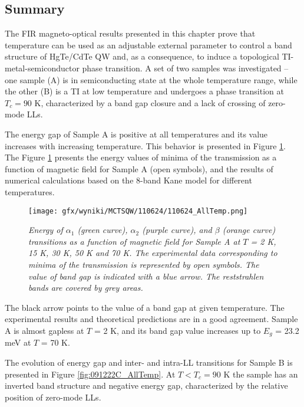 \documentclass[titlepage,a4paper]{book}
\newcommand{\wciecie}{\quad\phantom{v}}
\begin{document}
\subsection{Summary}
\wciecie
The FIR magneto-optical results presented in this chapter prove that temperature can be used as an adjustable external parameter to control a band structure of HgTe/CdTe QW and, as a consequence, to induce a topological TI-metal-semiconductor phase transition. A set of two samples was investigated -- one sample (A) is in semiconducting state at the whole temperature range, while the other (B) is a TI at low temperature and undergoes a phase transition at $T_c = 90$ K, characterized by a band gap closure and a lack of crossing of zero-mode LLs. 

The energy gap of Sample A is positive at all temperatures and its value increases with increasing temperature. This behavior is presented in Figure \ref{fig:110624_AllTemp}. The Figure \ref{fig:110624_AllTemp} presents the energy values of minima of the transmission as a function of magnetic field for Sample A (open symbols), and the results of numerical calculations based on the 8-band Kane model for different temperatures.   
\begin{figure}[ht]
	\centering
	\texttt{[image: gfx/wyniki/MCTSQW/110624/110624\_AllTemp.png]}
	\vspace{-10pt}
	\caption{\textit{Energy of $\alpha_1$ (green curve), $\alpha_2$ (purple curve), and $\beta$ (orange curve) transitions as a function of magnetic field for Sample A at $T$ = 2 K, 15 K, 30 K, 50 K and 70 K. The experimental data corresponding to minima of the transmission is represented by open symbols. The value of band gap is indicated with a blue arrow. The reststrahlen bands are covered by grey areas.}}
	\label{fig:110624_AllTemp}
\end{figure}
The black arrow points to the value of a band gap at given temperature. The experimental results and theoretical predictions are in a good agreement. Sample A is almost gapless at $T$ = 2 K, and its band gap value increases up to $E_g$ = 23.2 meV at $T$ = 70 K.

The evolution of energy gap and inter- and intra-LL transitions for Sample B is presented in Figure \ref{fig:091222C_AllTemp}. At $T < T_c = 90$ K the sample has an inverted band structure and negative energy gap, characterized by the relative position of zero-mode LLs. 
\end{document}
